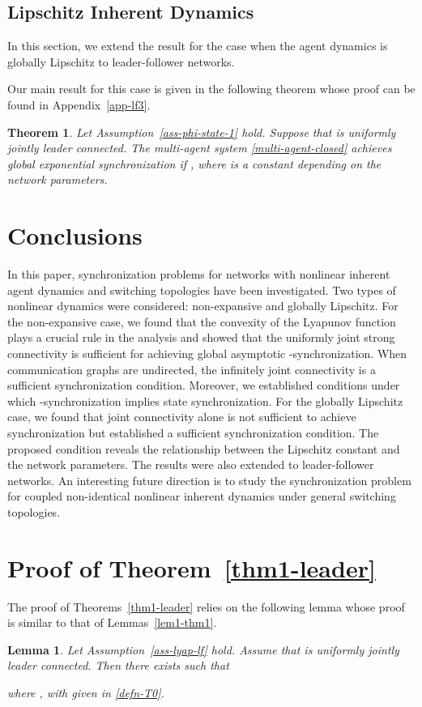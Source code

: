 \documentclass[a4paper, 11pt]{article}
\newtheorem{theorem}{Theorem}
\newtheorem{lemma}{Lemma}
\begin{document}
\subsection{Lipschitz Inherent Dynamics}

In this section, we extend the result for the case when the agent dynamics is globally Lipschitz to leader-follower networks.

Our main result for this case is given in the following theorem whose proof can be found in Appendix~\ref{app-lf3}.

\begin{theorem}\label{unstable-thm2}
Let Assumption~\ref{ass-phi-state-1} hold. Suppose that  is uniformly jointly leader connected.
The multi-agent system \eqref{multi-agent-closed} achieves global exponential synchronization if , where  is a constant depending on the
network parameters.
\end{theorem}

\section{Conclusions}\label{sec-conclusion}
In this paper, synchronization problems for networks with nonlinear inherent agent dynamics and switching topologies
have been investigated. Two types of nonlinear dynamics were considered: non-expansive and globally Lipschitz.
For the non-expansive case, we found that the convexity of the Lyapunov function plays a crucial rule in the analysis
and showed that the uniformly joint strong connectivity is sufficient for achieving global asymptotic -synchronization.
When communication graphs are undirected, the infinitely joint connectivity is a sufficient synchronization condition.
Moreover, we established conditions under which -synchronization implies state synchronization.
For the globally Lipschitz case, we found that joint connectivity alone is not sufficient to achieve synchronization
but established a sufficient synchronization condition. The proposed condition reveals the relationship between the Lipschitz constant and the network parameters. 
The results were also extended to leader-follower networks.
An interesting future direction is to study the synchronization problem for coupled non-identical nonlinear inherent dynamics under general switching topologies.






\appendix

\section{Proof of Theorem~\ref{thm1-leader}}\label{app-lf1}
The proof of Theorems~\ref{thm1-leader} relies on the following lemma whose proof is similar to that of Lemmas~\ref{lem1-thm1}.
\begin{lemma}\label{lem1-thm3}
Let Assumption~\ref{ass-lyap-lf} hold.  Assume that  is uniformly jointly leader connected.
Then there exists  such that

where , with  given in \eqref{defn-T0}.
\end{lemma}
\end{document}

